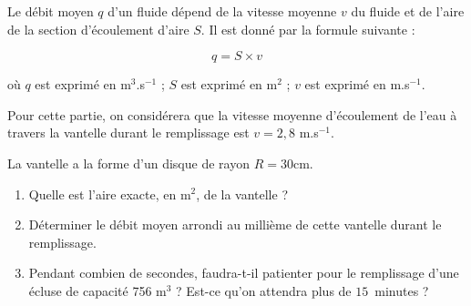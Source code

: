 
\medskip 

Le débit moyen $q$ d'un fluide dépend de la vitesse moyenne $v$ du fluide et de l'aire de la section d'écoulement d'aire $S$. Il est donné par la formule suivante : 

\[q = S \times v\]
 
où $q$ est exprimé en m$^3$.s$^{-1}$ ; $S$ est exprimé en m$^2$ ; $v$ est exprimé en m.s$^{-1}$. 

Pour cette partie, on considérera que la vitesse moyenne d'écoulement de l'eau à travers la vantelle durant le remplissage est $v = 2,8$ m.s$^{-1}$.
 
La vantelle a la forme d'un disque de rayon $R = 30$cm. 

\medskip

\begin{enumerate}
\item Quelle est l'aire exacte, en m$^2$, de la vantelle ? 
\item Déterminer le débit moyen arrondi au millième de cette vantelle durant le 
remplissage. 
\item Pendant combien de secondes, faudra-t-il patienter pour le remplissage d'une écluse de capacité 756 m$^3$ ? Est-ce qu'on attendra plus de $15$~minutes ?
\end{enumerate}
	 
\vspace{0,5cm}

